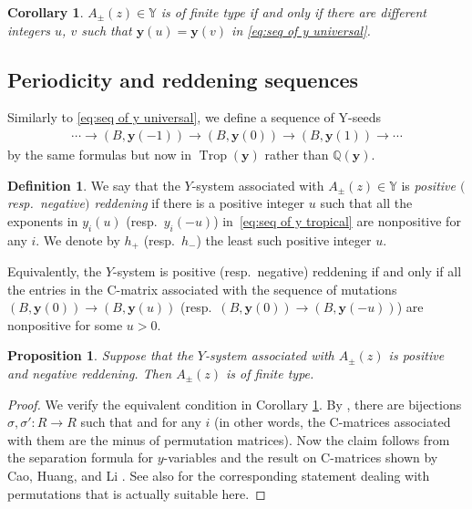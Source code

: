 \documentclass[pdftex]{sigma}
\numberwithin{equation}{section}
\newtheorem{Corollary}[Theorem]{Corollary}
\newtheorem{Proposition}[Theorem]{Proposition}
\theoremstyle{definition}
\newtheorem{Definition}[Theorem]{Definition}
\DeclareMathOperator{\Trop}{Trop}
\begin{document}
\begin{Corollary}\label{cor:finite iff periodic for universal y}
 $A_{\pm} (z) \in \mathbb{Y}$ is of finite type if and only if there are different integers $u$, $v$ such that
 $\boldsymbol{y}(u) = \boldsymbol{y} (v)$ in \eqref{eq:seq of y universal}.
\end{Corollary}

\subsection{Periodicity and reddening sequences}
Similarly to \eqref{eq:seq of y universal}, we define a sequence of Y-seeds
\begin{align}\label{eq:seq of y tropical}
 \cdots \to (B, \boldsymbol{y}(-1)) \to (B, \boldsymbol{y}(0)) \to (B, \boldsymbol{y}(1)) \to \cdots
\end{align}
by the same formulas but now in $\Trop(\boldsymbol{y})$ rather than $\mathbb{Q}(\boldsymbol{y})$.

\begin{Definition}
 We say that the $Y$-system associated with $A_\pm (z) \in \mathbb{Y}$ is \emph{positive $($resp.\ negative$)$ reddening} if
 there is a positive integer $u$ such that
 all the exponents in $y_i(u)$ (resp.\ $y_i(-u)$) in~\eqref{eq:seq of y tropical} are nonpositive for any $i$.
 We denote by $h_+$ (resp.\ $h_-$) the least such positive integer $u$.
\end{Definition}

Equivalently, the $Y$-system is positive (resp.\ negative) reddening if and only if all the entries in the
C-matrix associated with the sequence of mutations
$(B, \boldsymbol{y}(0)) \to (B, \boldsymbol{y}(u))$
(resp.\ $(B, \boldsymbol{y}(0)) \to (B, \boldsymbol{y}(-u))$)
are nonpositive for some $u>0$.

\begin{Proposition}\label{prop:fin type of reddening}
 Suppose that the $Y$-system associated with $A_\pm (z)$ is positive and negative reddening.
 Then $A_\pm (z)$ is of finite type.
\end{Proposition}
\begin{proof}
 We verify the equivalent condition in Corollary \ref{cor:finite iff periodic for universal y}.
 By \cite[Proposition 2.10]{BDP},
 there are bijections $\sigma, \sigma' \colon R \to R$ such that
  and  for any $i$
 (in other words, the C-matrices associated with them are the minus of permutation matrices).
 Now the claim follows from the separation formula for $y$-variables \cite[Proposition 3.13]{FZ4} and
 the result on C-matrices shown by Cao, Huang, and Li \cite[Theorem 2.5]{CHL20}.
 See also \cite[Theorem 5.2]{nakanishi2019synchronicity} for the corresponding statement dealing with permutations
 that is actually suitable here.
\end{proof}
\end{document}
